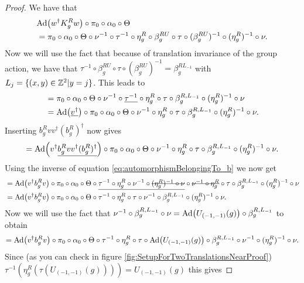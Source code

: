 \documentclass[11pt,a4paper,twoside]{article}
\numberwithin{equation}{section}
\begin{document}
\begin{proof}
	We have that
	\begin{align}
		&\Ad{w^\dagger K_g^R w}\circ\pi_0\circ\alpha_0\circ\Theta\\
		&=\pi_0\circ\alpha_0\circ\Theta\circ\nu^{-1}\circ\tau^{-1}\circ\eta_g^R\circ\beta_g^{RU}\circ\tau\circ(\beta_g^{RU})^{-1}\circ(\eta_g^R)^{-1}\circ\nu.
	\end{align}
	Now we will use the fact that because of translation invariance of the group action, we have that $\tau^{-1}\circ\beta_g^{RU}\circ\tau\circ(\beta_g^{RU})^{-1}=\beta_g^{RL_{-1}}$ with $L_j=\{(x,y)\in\mathbb Z^2|y=j\}$. This leads to
	\begin{align}
		&=\pi_0\circ\alpha_0\circ\Theta\circ\nu^{-1}\circ\underline{\tau^{-1}}\circ\eta_g^R\circ\tau\circ\beta_g^{R,L_{-1}}\circ(\eta_g^R)^{-1}\circ\nu\\
		&=\Ad{\underline{v^\dagger}}\circ \pi_0\circ\alpha_0\circ\Theta\circ\nu^{-1}\circ\eta_g^R\circ\tau\circ\beta_g^{R,L_{-1}}\circ(\eta_g^R)^{-1}\circ\nu.
	\end{align}
	Inserting $b^R_g v v^\dagger (b^R_g)^\dagger$ now gives
	\begin{equation}
		=\Ad{v^\dagger\underline{b^R_g v v^\dagger (b^R_g)^\dagger}}\circ \pi_0\circ\alpha_0\circ\Theta\circ\nu^{-1}\circ\eta_g^R\circ\tau\circ\beta_g^{R,L_{-1}}\circ(\eta_g^R)^{-1}\circ\nu.
	\end{equation}
	 Using the inverse of equation \eqref{eq:automorphismBelongingTo_b} we now get
	\begin{align}
		&=\Ad{v^\dagger b^R_g v }\circ \pi_0\circ\alpha_0\circ\Theta\circ\underline{\tau^{-1}\circ\eta_g^R\circ\nu^{-1}\circ\stkout{(\eta_g^R)^{-1}\circ\nu}}\circ\stkout{\nu^{-1}\circ\eta_g^R}\circ\tau\circ\beta_g^{R,L_{-1}}\circ(\eta_g^R)^{-1}\circ\nu\\
		&=\Ad{v^\dagger b_g^R v}\circ\pi_0\circ\alpha_0\circ\Theta\circ\tau^{-1}\circ\eta_g^R\circ\tau\circ\nu^{-1}\circ\beta_g^{R,L_{-1}}\circ(\eta_g^R)^{-1}\circ\nu.
	\end{align}
	Now we will use the fact that $\nu^{-1}\circ\beta_g^{R,L_{-1}}\circ\nu=\Ad{U_{(-1,-1)}(g)}\circ\beta_g^{R,L_{-1}}$ to obtain
	\begin{equation}
		=\Ad{v^\dagger b_g^R v}\circ\pi_0\circ\alpha_0\circ\Theta\circ\tau^{-1}\circ\eta_g^R\circ\tau\circ\Ad{U_{(-1,-1)}(g)}\circ\beta_g^{R,L_{-1}}\circ\nu^{-1}\circ(\eta_g^R)^{-1}\circ\nu.
	\end{equation}
	Since (as you can check in figure \ref{fig:SetupForTwoTranslationsNearProof}) $\tau^{-1}(\eta_g^R(\tau(U_{(-1,-1)}(g))))=U_{(-1,-1)}(g)$ this gives

\end{proof}
\end{document}
